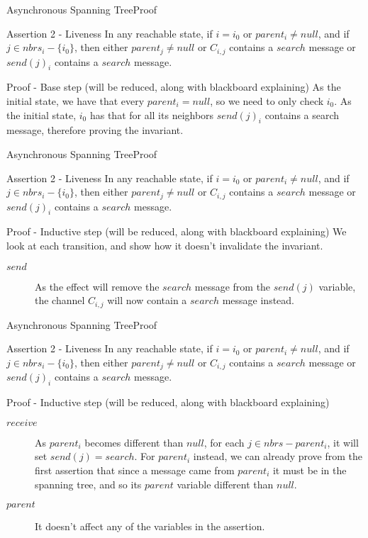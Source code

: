 \documentclass[pdf]{beamer}
\begin{document}
\begin{frame}[plain]{Asynchronous Spanning Tree}{Proof}
    \begin{block}{Assertion 2 - Liveness}
        In any reachable state, if $i=i_0$ or $parent_i \neq null$, and if $j \in nbrs_i - \{i_0\}$,
        then either $parent_j \neq null$ or $C_{i,j}$ contains a $search$ message or $send(j)_i$ contains a $search$ message.
    \end{block}	
    \begin{block}{Proof - Base step (will be reduced, along with blackboard explaining)}
    As the initial state, we have that every $parent_i = null$, so we need to only check $i_0$.
    As the initial state, $i_0$ has that for all its neighbors $send(j)_i$ contains a search message,
    therefore proving the invariant.
    \end{block}
\end{frame}
\begin{frame}[plain]{Asynchronous Spanning Tree}{Proof}
    \begin{block}{Assertion 2 - Liveness}
        In any reachable state, if $i=i_0$ or $parent_i \neq null$, and if $j \in nbrs_i - \{i_0\}$,
        then either $parent_j \neq null$ or $C_{i,j}$ contains a $search$ message or $send(j)_i$ contains a $search$ message.
    \end{block}	
    \begin{block}{Proof - Inductive step (will be reduced, along with blackboard explaining)}
    We look at each transition, and show how it doesn't invalidate the invariant.
    \begin{description}
    \item[$send$]{As the effect will remove the $search$ message from the $send(j)$ variable, the channel $C_{i,j}$ will now contain a $search$ message instead.}
    \end{description}
    \end{block}
\end{frame}
\begin{frame}[plain]{Asynchronous Spanning Tree}{Proof}
    \begin{block}{Assertion 2 - Liveness}
        In any reachable state, if $i=i_0$ or $parent_i \neq null$, and if $j \in nbrs_i - \{i_0\}$,
        then either $parent_j \neq null$ or $C_{i,j}$ contains a $search$ message or $send(j)_i$ contains a $search$ message.
    \end{block}	
    \begin{block}{Proof - Inductive step (will be reduced, along with blackboard explaining)}
    \begin{description}
    \item[$receive$]{As $parent_i$ becomes different than $null$, for each $j \in nbrs - {parent_i}$,
    it will set $send(j) = search$. For $parent_i$ instead, we can already prove from the first assertion that since a message came from $parent_i$ it must be in the spanning tree, and so its $parent$ variable different than $null$.}
    \item[$parent$]{It doesn't affect any of the variables in the assertion.}
    \end{description}
    \end{block}
\end{frame}
\end{document}
